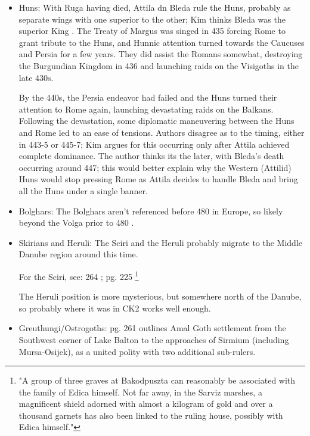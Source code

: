 \documentclass{article}
\newcommand{\specificCite}[1]{\tiny #1 \normalsize}
\begin{document}
	\begin{itemize}
		\item Huns:\newline
		With Ruga having died, Attila dn Bleda rule the Huns, probably as separate wings with one superior to the other; Kim thinks Bleda was the superior King \cite{KimHuns}.
		The Treaty of Margus was singed in 435 forcing Rome to grant tribute to the Huns, and Hunnic attention turned towards the Caucuses and Persia for a few years.
		They did assist the Romans somewhat, destroying the Burgundian Kingdom in 436 and launching raids on the Visigoths in the late 430s.
		
		By the 440s, the Persia endeavor had failed and the Huns turned their attention to Rome again, launching devastating raids on the Balkans.
		Following the devastation, some diplomatic maneuvering between the Huns and Rome led to an ease of tensions.
		Authors disagree as to the timing, either in 443-5 or 445-7; Kim argues for this occurring only after Attila achieved complete dominance.
		The author thinks its the later, with Bleda's death occurring around 447; this would better explain why the Western (Attilid) Huns would stop pressing Rome as Attila decides to handle Bleda and bring all the Huns under a single banner.
		
		\item Bolghars:\newline
		The Bolghars aren't referenced before 480 in Europe, so likely beyond the Volga prior to 480 \cite{KimHuns}.
		
		\item Skirians and Heruli:\newline
		The Sciri and the Heruli probably migrate to the Middle Danube region around this time.
		
		For the Sciri, see: \cite{WolframHistoryOfTheGoths,ToddEarlyGermans} \specificCite{264}; \specificCite{pg. 225}\footnote{"A group of three graves at Bakodpuszta can reasonably be associated with the family of Edica himself. Not far away, in the Sarviz marshes, a magnificent shield adorned with almost a kilogram of gold and over a thousand garnets has also been linked to the ruling house, possibly with Edica himself."}
		
		The Heruli position is more mysterious, but somewhere north of the Danube, so probably where it was in CK2 works well enough.
		
		\item Greuthungi/Ostrogoths:\newline
		\cite{WolframHistoryOfTheGoths}\specificCite{pg. 261} outlines Amal Goth settlement from the Southwest corner of Lake Balton to the approaches of Sirmium (including Mursa-Osijek), as a united polity with two additional sub-rulers.
		

\end{itemize}
\end{document}
